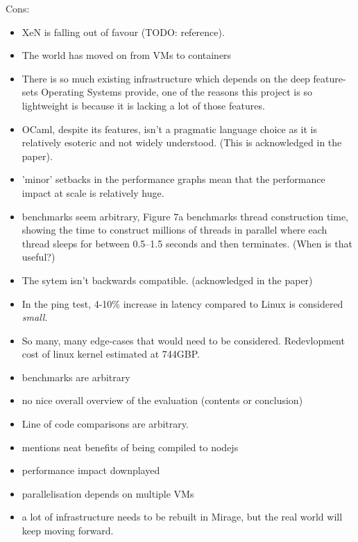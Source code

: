 \documentclass[11pt]{article}
\begin{document}
Cons:

\begin{itemize}

    \item XeN is falling out of favour (TODO: reference).



    \item The world has moved on from VMs to containers

    \item There is so much existing infrastructure which depends on the deep
    feature-sets Operating Systems provide, one of the reasons this project is
    so lightweight is because it is lacking a lot of those features.

    \item OCaml, despite its features, isn't a pragmatic language choice as it
    is relatively esoteric and not widely understood. (This is acknowledged in
    the paper).

    \item 'minor' setbacks in the performance graphs mean that the performance
    impact at scale is relatively huge.

    \item benchmarks seem arbitrary, Figure 7a benchmarks thread construction
    time, showing the time to construct millions of threads in parallel where
    each thread sleeps for between 0.5–1.5 seconds and then terminates. (When is that useful?)

    \item The sytem isn't backwards compatible. (acknowledged in the paper)

    \item In the ping test, 4-10\% increase in latency compared to Linux is
    considered \textit{small}.

    \item So many, many edge-cases that would need to be considered.
    Redevlopment cost of linux kernel estimated at 744GBP. %

    \item benchmarks are arbitrary

    \item no nice overall overview of the evaluation (contents or conclusion)

    \item Line of code comparisons are arbitrary.

    \item mentions neat benefits of being compiled to nodejs

    \item performance impact downplayed

    \item parallelisation depends on multiple VMs

    \item a lot of infrastructure needs to be rebuilt in Mirage, but the real
    world will keep moving forward.

\end{itemize}
\end{document}
